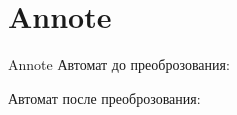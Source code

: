 \section{Annote}
\begin{frame}{Annote}
	Автомат до преоброзования:


	Автомат после преоброзования:


\end{frame}
